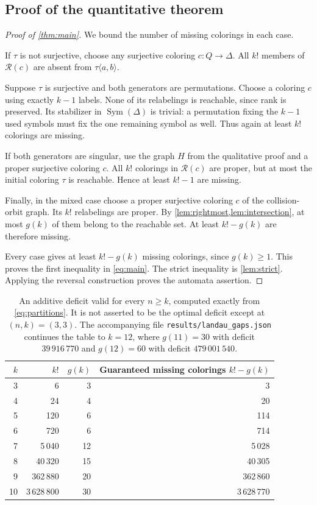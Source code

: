 \documentclass[11pt,a4paper]{article}
\numberwithin{equation}{section}
\theoremstyle{definition}
\theoremstyle{remark}
\newcommand{\D}{\Delta}
\newcommand{\Sym}{\operatorname{Sym}}
\begin{document}
\subsection{Proof of the quantitative theorem}

\begin{proof}[Proof of \cref{thm:main}]
We bound the number of missing colorings in each case.

If $\tau$ is not surjective, choose any surjective coloring $c:Q\to\D$.
All $k!$ members of $\mathcal R(c)$ are absent from $\tau\langle a,b\rangle$.

Suppose $\tau$ is surjective and both generators are permutations. Choose a
coloring $c$ using exactly $k-1$ labels. None of its relabelings is reachable,
since rank is preserved. Its stabilizer in $\Sym(\D)$ is trivial: a
permutation fixing the $k-1$ used symbols must fix the one remaining symbol
as well. Thus again at least $k!$ colorings are missing.

If both generators are singular, use the graph $H$ from the qualitative
proof and a proper surjective coloring $c$. All $k!$ colorings in
$\mathcal R(c)$ are proper, but at most the initial coloring $\tau$ is
reachable. Hence at least $k!-1$ are missing.

Finally, in the mixed case choose a proper surjective coloring $c$ of the
collision-orbit graph. Its $k!$ relabelings are proper. By
\cref{lem:rightmost,lem:intersection}, at most $g(k)$ of them belong to the
reachable set. At least $k!-g(k)$ are therefore missing.

Every case gives at least $k!-g(k)$ missing colorings, since $g(k)\ge1$.
This proves the first inequality in \eqref{eq:main}. The strict inequality
is \cref{lem:strict}. Applying the reversal construction proves the automata
assertion.
\end{proof}

\begin{table}[htbp]
\centering
\begin{tabular}{@{}rrrr@{}}
\toprule
$k$ & $k!$ & $g(k)$ & Guaranteed missing colorings $k!-g(k)$\\
\midrule
3 & 6 & 3 & 3\\
4 & 24 & 4 & 20\\
5 & 120 & 6 & 114\\
6 & 720 & 6 & 714\\
7 & 5\,040 & 12 & 5\,028\\
8 & 40\,320 & 15 & 40\,305\\
9 & 362\,880 & 20 & 362\,860\\
10 & 3\,628\,800 & 30 & 3\,628\,770\\
\bottomrule
\end{tabular}
\caption{An additive deficit valid for every $n\ge k$, computed exactly from
\eqref{eq:partitions}. It is not asserted to be the optimal deficit except
at $(n,k)=(3,3)$. The accompanying file
\texttt{results/landau\_gaps.json} continues the table to $k=12$, where
$g(11)=30$ with deficit $39\,916\,770$ and $g(12)=60$ with deficit
$479\,001\,540$.}
\label{tab:landau}
\end{table}
\end{document}
